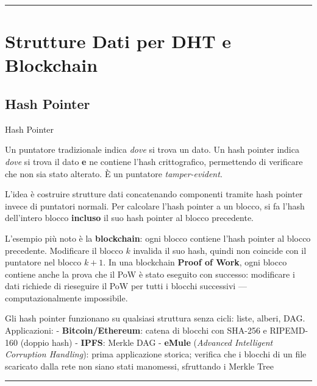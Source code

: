 \documentclass[
  italian,
  openany]{book}
\begin{document}
\begin{center}\rule{0.5\linewidth}{0.5pt}\end{center}

\section{Strutture Dati per DHT e
Blockchain}\label{strutture-dati-per-dht-e-blockchain}

\subsection{Hash Pointer}\label{hash-pointer}

\begin{calloutdefinition}{Hash Pointer}

Un puntatore tradizionale indica \emph{dove} si trova un dato. Un hash
pointer indica \emph{dove} si trova il dato \textbf{e} ne contiene
l'hash crittografico, permettendo di verificare che non sia stato
alterato. È un puntatore \emph{tamper-evident}.

\end{calloutdefinition}

L'idea è costruire strutture dati concatenando componenti tramite hash
pointer invece di puntatori normali. Per calcolare l'hash pointer a un
blocco, si fa l'hash dell'intero blocco \textbf{incluso} il suo hash
pointer al blocco precedente.

L'esempio più noto è la \textbf{blockchain}: ogni blocco contiene l'hash
pointer al blocco precedente. Modificare il blocco \(k\) invalida il suo
hash, quindi non coincide con il puntatore nel blocco \(k+1\). In una
blockchain \textbf{Proof of Work}, ogni blocco contiene anche la prova
che il PoW è stato eseguito con successo: modificare i dati richiede di
rieseguire il PoW per tutti i blocchi successivi --- computazionalmente
impossibile.

Gli hash pointer funzionano su qualsiasi struttura senza cicli: liste,
alberi, DAG. Applicazioni: - \textbf{Bitcoin/Ethereum}: catena di
blocchi con SHA-256 e RIPEMD-160 (doppio hash) - \textbf{IPFS}: Merkle
DAG - \textbf{eMule} (\emph{Advanced Intelligent Corruption Handling}):
prima applicazione storica; verifica che i blocchi di un file scaricato
dalla rete non siano stati manomessi, sfruttando i Merkle Tree

\begin{center}\rule{0.5\linewidth}{0.5pt}\end{center}
\end{document}
